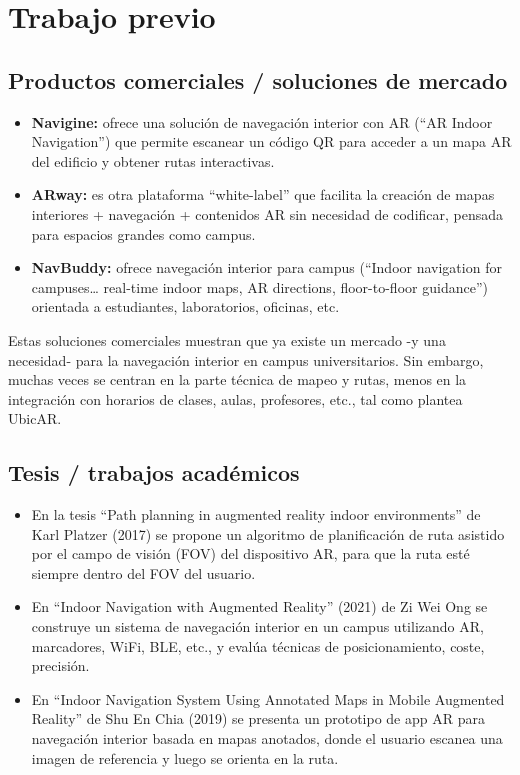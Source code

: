 \section{Trabajo previo}

\subsection{Productos comerciales / soluciones de mercado}

\begin{itemize}
	
	\item \textbf{Navigine:} ofrece una solución de navegación interior con AR (“AR Indoor Navigation”) que permite escanear un código QR para acceder a un mapa AR del edificio y obtener rutas interactivas. 
	
	\item \textbf{ARway:} es otra plataforma “white-label” que facilita la creación de mapas interiores + navegación + contenidos AR sin necesidad de codificar, pensada para espacios grandes como campus. 
	
	\item \textbf{NavBuddy:} ofrece navegación interior para campus (“Indoor navigation for campuses… real-time indoor maps, AR directions, floor-to-floor guidance”) orientada a estudiantes, laboratorios, oficinas, etc.
	
\end{itemize}

Estas soluciones comerciales muestran que ya existe un mercado -y una necesidad- para la navegación interior en campus universitarios. Sin embargo, muchas veces se centran en la parte técnica de mapeo y rutas, menos en la integración con horarios de clases, aulas, profesores, etc., tal como plantea UbicAR.

\subsection{Tesis / trabajos académicos} 

\begin{itemize}
	
	\item En la tesis “Path planning in augmented reality indoor environments” de Karl Platzer (2017) se propone un algoritmo de planificación de ruta asistido por el campo de visión (FOV) del dispositivo AR, para que la ruta esté siempre dentro del FOV del usuario.
	
	\item En “Indoor Navigation with Augmented Reality” (2021) de Zi Wei Ong se construye un sistema de navegación interior en un campus utilizando AR, marcadores, WiFi, BLE, etc., y evalúa técnicas de posicionamiento, coste, precisión.
	
	\item En “Indoor Navigation System Using Annotated Maps in Mobile Augmented Reality” de Shu En Chia (2019) se presenta un prototipo de app AR para navegación interior basada en mapas anotados, donde el usuario escanea una imagen de referencia y luego se orienta en la ruta. 
	
\end{itemize}

